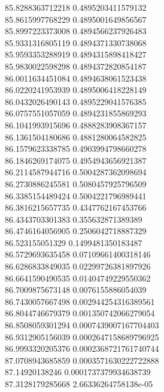 {85.8288363712218 0.4895203411579132
 \\
85.8615997768229 0.4895001649856567
 \\
85.8997223373008 0.4894566237926483
 \\
85.9331316805119 0.4894371330738068
 \\
85.9593353288919 0.4894315898418427
 \\
85.9830022598298 0.4894372820854187
 \\
86.0011634451084 0.4894638061523438
 \\
86.0220241953939 0.4895006418228149
 \\
86.0432026490143 0.4895229041576385
 \\
86.0757551057059 0.4894231855869293
 \\
86.1041993915696 0.4888283908367157
 \\
86.1361504180686 0.4881280064582825
 \\
86.1579623338785 0.4903994798660278
 \\
86.1846269174075 0.4954943656921387
 \\
86.2114587944716 0.5004287362098694
 \\
86.2730886245581 0.5080457925796509
 \\
86.3385154489424 0.5004221796989441
 \\
86.3816215657735 0.4347762167453766
 \\
86.4343703301383 0.355632871389389
 \\
86.4746164056905 0.2506042718887329
 \\
86.523155051329 0.1499481350183487
 \\
86.5729693635458 0.07109661400318146
 \\
86.6286833849035 0.02299726381897926
 \\
86.6641590490535 0.01404749229550362
 \\
86.7009875673148 0.0076155886054039
 \\
86.7430057667498 0.002944254316389561
 \\
86.8044746679379 0.001350742066279054
 \\
86.8508059301294 0.0007439007167704403
 \\
86.9312905156039 0.0002647158689796925
 \\
86.9993320205376 0.0002368721761740744
 \\
87.0708943685859 0.0003571630222722888
 \\
87.14920138246 0.0001737379934638739
 \\
87.3128179285668 2.66336264758138e-05
}
